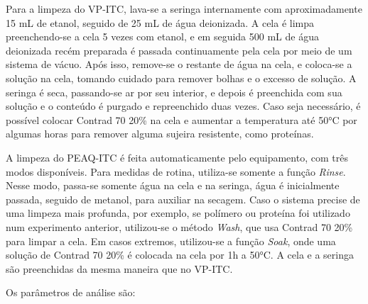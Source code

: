 		Para a limpeza do VP-ITC, lava-se a seringa internamente com aproximadamente 15 mL de etanol, seguido de 25 mL de água deionizada. A cela é limpa preenchendo-se a cela 5 vezes com etanol, e em seguida 500 mL de água deionizada recém preparada é passada continuamente pela cela por meio de um sistema de vácuo. Após isso, remove-se o restante de água na cela, e coloca-se a solução na cela, tomando cuidado para remover bolhas e o excesso de solução. A seringa é seca, passando-se ar por seu interior, e depois é preenchida com sua solução e o conteúdo é purgado e repreenchido duas vezes. Caso seja necessário, é possível colocar Contrad 70 20\% na cela e aumentar a temperatura até 50°C por algumas horas para remover alguma sujeira resistente, como proteínas.
		
		A limpeza do PEAQ-ITC é feita automaticamente pelo equipamento, com três modos disponíveis. Para medidas de rotina, utiliza-se somente a função \emph{Rinse}. Nesse modo, passa-se somente água na cela e na seringa, água é inicialmente passada, seguido de metanol, para auxiliar na secagem. Caso o sistema precise de uma limpeza mais profunda, por exemplo, se polímero ou proteína foi utilizado num experimento anterior, utilizou-se o método \emph{Wash}, que usa Contrad 70 20\% para limpar a cela. Em casos extremos, utilizou-se a função \emph{Soak}, onde uma solução de Contrad 70 20\% é colocada na cela por 1h a 50°C. A cela e a seringa são preenchidas da mesma maneira que no VP-ITC.
		
		Os parâmetros de análise são: %
		
